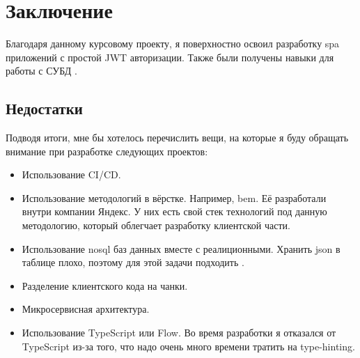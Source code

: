\section{Заключение}
Благодаря данному курсовому проекту, я поверхностно освоил разработку \acrshort{spa} приложений с простой JWT авторизации. Также были получены навыки для работы с СУБД \textcite{postgres}.

\subsection{Недостатки}
Подводя итоги, мне бы хотелось перечислить вещи, на которые я буду обращать внимание при разработке следующих проектов:
\begin{itemize}
    \item Использование CI/CD.
    \item Использование методологий в вёрстке. Например, \acrfull{bem}. Её разработали внутри компании Яндекс. У них есть свой стек технологий под данную методологию, который облегчает разработку клиентской части.
    \item Использование \acrshort{nosql} баз данных вместе с реалиционными. Хранить \acrshort{json} в таблице плохо, поэтому для этой задачи подходить \textcite{mongodb}.
    \item Разделение клиентского кода на чанки.
    \item Микросервисная архитектура.
    \item Использование TypeScript или Flow. Во время разработки я отказался от TypeScript из-за того, что надо очень много времени тратить на type-hinting.
\end{itemize}

\clearpage